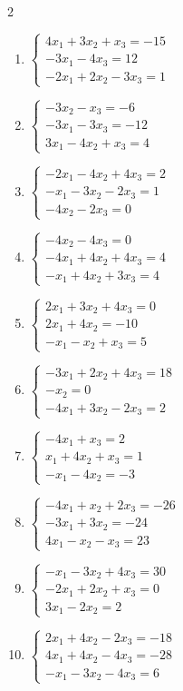 \begin{multicols}{2}
\begin{enumerate}[label=\arabic*., leftmargin=*]
\item $\begin{cases}4x_1+3x_2+x_3=-15\\-3x_1-4x_3=12\\-2x_1+2x_2-3x_3=1\end{cases}$
\item $\begin{cases}-3x_2-x_3=-6\\-3x_1-3x_3=-12\\3x_1-4x_2+x_3=4\end{cases}$
\item $\begin{cases}-2x_1-4x_2+4x_3=2\\-x_1-3x_2-2x_3=1\\-4x_2-2x_3=0\end{cases}$
\item $\begin{cases}-4x_2-4x_3=0\\-4x_1+4x_2+4x_3=4\\-x_1+4x_2+3x_3=4\end{cases}$
\item $\begin{cases}2x_1+3x_2+4x_3=0\\2x_1+4x_2=-10\\-x_1-x_2+x_3=5\end{cases}$
\item $\begin{cases}-3x_1+2x_2+4x_3=18\\-x_2=0\\-4x_1+3x_2-2x_3=2\end{cases}$
\item $\begin{cases}-4x_1+x_3=2\\x_1+4x_2+x_3=1\\-x_1-4x_2=-3\end{cases}$
\item $\begin{cases}-4x_1+x_2+2x_3=-26\\-3x_1+3x_2=-24\\4x_1-x_2-x_3=23\end{cases}$
\item $\begin{cases}-x_1-3x_2+4x_3=30\\-2x_1+2x_2+x_3=0\\3x_1-2x_2=2\end{cases}$
\item $\begin{cases}2x_1+4x_2-2x_3=-18\\4x_1+4x_2-4x_3=-28\\-x_1-3x_2-4x_3=6\end{cases}$

\end{enumerate}
\end{multicols}
